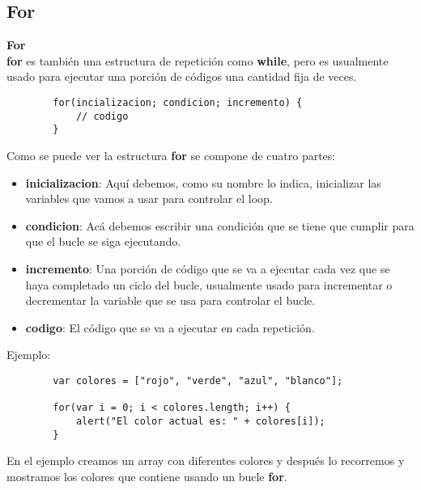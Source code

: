 \documentclass[handout, 10pt]{beamer}
\begin{document}
\subsection{For}
\begin{frame}[fragile]
	\textbf{\large{For}} \\
	
	\textbf{for} es también una estructura de repetición como \textbf{while}, pero es usualmente usado para ejecutar
	una porción de códigos una cantidad fija de veces.
	
	\begin{lstlisting}
		for(incializacion; condicion; incremento) {
			// codigo
		} 
	\end{lstlisting}
	
	\pause
	
	Como se puede ver la estructura \textbf{for} se compone de cuatro partes: 
	\begin{itemize}
		\pause \item \textbf{inicializacion}: Aquí debemos, como su nombre lo indica, inicializar las variables que vamos
		      a usar para controlar el loop.
		\pause \item \textbf{condicion}: Acá debemos escribir una condición que se tiene que cumplir para que el bucle se
				siga ejecutando.
		\pause \item \textbf{incremento}: Una porción de código que se va a ejecutar cada vez que se haya completado un
				ciclo del bucle, usualmente usado para incrementar o decrementar la variable que se usa para controlar
				el bucle.
		\pause \item \textbf{codigo}: El código que se va a ejecutar en cada repetición.
	\end{itemize}
\end{frame}

\begin{frame}[fragile]
	\pause
	
	Ejemplo:
	
	\begin{lstlisting}
		var colores = ["rojo", "verde", "azul", "blanco"];
		
		for(var i = 0; i < colores.length; i++) {
			alert("El color actual es: " + colores[i]);
		}
	\end{lstlisting}
	
	\pause En el ejemplo creamos un array con diferentes colores y después lo recorremos y mostramos
	       los colores que contiene usando un bucle \textbf{for}.

\end{frame}
\end{document}

